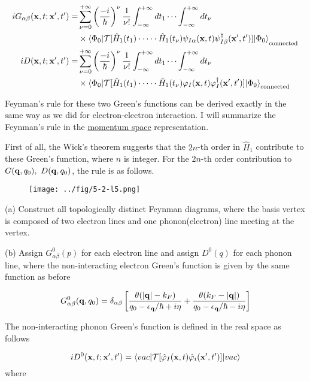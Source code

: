 \[\begin{split}
iG_{\alpha\beta}({\bf x},t;{\bf x'},t') =& \sum_{\nu = 0}^{+\infty}\left(\frac{-i}{\hbar}\right)^\nu\frac{1}{\nu!}\int_{-\infty}^{+\infty}dt_1\cdots\int_{-\infty}^{+\infty}dt_\nu\\
&\times {\langle\Phi_0|\mathcal{T}[\hat H_1(t_1)\cdot\cdots\cdot\hat H_1(t_\nu)\psi_{I\alpha}({\bf x},t)\psi_{I\beta}^
\dagger({\bf x'},t')]|\Phi_0\rangle}_{\text{connected}}\\
iD({\bf x},t;{\bf x'},t') =& \sum_{\nu = 0}^{+\infty}\left(\frac{-i}{\hbar}\right)^\nu\frac{1}{\nu!}\int_{-\infty}^{+\infty}dt_1\cdots\int_{-\infty}^{+\infty}dt_\nu\\
&\times {\langle\Phi_0|\mathcal{T}[\hat H_1(t_1)\cdot\cdots\cdot\hat H_1(t_\nu)\varphi_{I}({\bf x},t)\varphi_{I}^
\dagger({\bf x'},t')]|\Phi_0\rangle}_{\text{connected}}
\end{split} \]

Feynman's rule for these two Green's functions can be derived exactly in the same way as we did for electron-electron interaction. I will summarize the Feynman's rule in the \uline{momentum space} representation.

First of all, the Wick's theorem suggests that the $2n$-th order in $\hat{H}_1$ contribute to these Green's function, where $n$ is integer. For the $2n$-th order contribution to $G({\bf q},q_0),\ D({\bf q},q_0)$, the rule is as follows.

\begin{wrapfigure}{l}{4cm}
\texttt{[image: ../fig/5-2-l5.png]}
\end{wrapfigure}
\noindent (a) Construct all topologically distinct Feynman diagrams, where the basis vertex is composed of two electron lines and one phonon(electron) line meeting at the vertex.

\noindent (b) Assign $G_{\alpha\beta}^0(p)$ for each electron line and assign $D^0(q)$ for each phonon line, where the non-interacting electron Green's function is given by the same function as before

\[G_{\alpha\beta}^0({\bf q},q_0) = \delta_{\alpha\beta}\left[\frac{\theta(|{\bf q}|-k_F)}{q_0-\epsilon_{\bf q}/\hbar+i\eta} + \frac{\theta(k_F - |{\bf q}|)}{q_0-\epsilon_{\bf q}/\hbar-i\eta}\right] \]

The non-interacting phonon Green's function is defined in the real space as follows

\[iD^0({\bf x},t;{\bf x'},t') = \langle vac|\mathcal{T}[\hat\varphi_I({\bf x},t)\hat\varphi_i({\bf x'},t')]|vac\rangle \]
where

